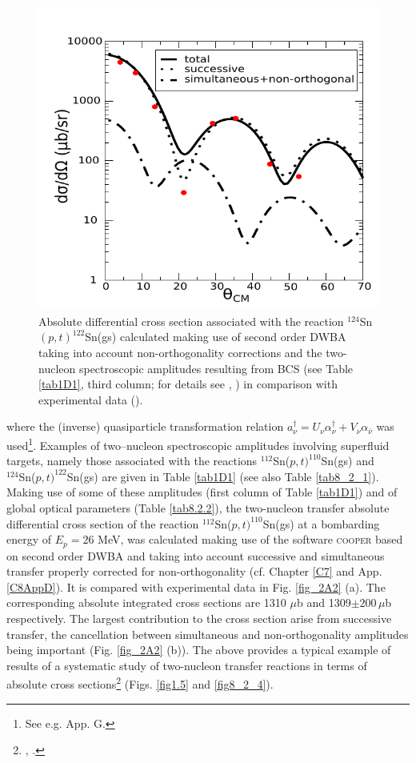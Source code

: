 \begin{figure}\label{fig2A3}
\centerline{\includegraphics*[width=\textwidth,angle=0]{nutshell/figs/fig2A3_v2}}
\caption{Absolute differential cross section associated with the reaction $^{124}$Sn$(p,t)^{122}$Sn(gs) calculated making use of second order DWBA taking into account non-orthogonality corrections and the two-nucleon spectroscopic amplitudes resulting from BCS (see Table \ref{tab1D1}, third column; for details see \cite{Potel:13}, \cite{Potel:13b}) in comparison with experimental data (\cite{Guazzoni:11}).}\label{fig_2A3}
\end{figure}
where the (inverse) quasiparticle transformation relation $a^{\dagger}_\nu=U_{\nu}\alpha^{\dagger}_{\nu}+V_{\nu}\alpha_{\bar{\nu}}$ was used\footnote{See e.g. \cite{Brink:05} App. G.}. Examples of  two--nucleon spectroscopic amplitudes involving superfluid targets, namely those associated with the reactions $^{112}$Sn($p,t)^{110}$Sn(gs) and\\ $^{124}$Sn($p,t)^{122}$Sn(gs) are given in Table \ref{tab1D1} (see also Table \ref{tab8_2_1}). Making use of some of these amplitudes (first column of Table \ref{tab1D1}) and of global optical parameters (Table \ref{tab8.2.2}), the two-nucleon transfer absolute differential cross section of the reaction $^{112}$Sn($p,t)^{110}$Sn(gs) at a bombarding energy of $E_p=26$ MeV, was calculated making use of the software \textsc{cooper} based on second order DWBA and taking into account successive and simultaneous transfer properly corrected for non-orthogonality (cf. Chapter \ref{C7} and App. \ref{C8AppD}). It is compared with experimental data in Fig. \ref{fig_2A2} (a). The corresponding absolute integrated cross sections are 1310 $\mu$b and 1309$\pm 200 \,\mu$b respectively. The largest contribution to the cross section  arise from successive transfer, the cancellation between simultaneous and non-orthogonality amplitudes being important (Fig. \ref{fig_2A2} (b)). The above provides a typical example of results of a systematic study of two-nucleon transfer reactions in terms of absolute cross sections\footnote{\cite{Potel:13}, \cite{Potel:13b}.} (Figs. \ref{fig1.5} and  \ref{fig8_2_4}).


